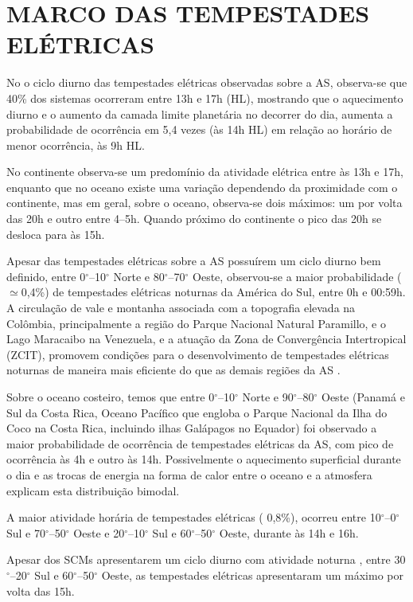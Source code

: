 \section{MARCO DAS TEMPESTADES ELÉTRICAS}

No o ciclo diurno das tempestades elétricas observadas sobre a AS, observa-se que 40\% dos sistemas ocorreram entre 13h e 17h (HL), mostrando que o aquecimento diurno e o aumento da camada limite planetária no decorrer do dia, aumenta a probabilidade de ocorrência em 5,4 vezes (às 14h HL) em relação ao horário de menor ocorrência, às 9h HL.

No continente observa-se um predomínio da atividade elétrica entre às 13h e 17h, enquanto que no oceano existe uma variação dependendo da proximidade com o continente, mas em geral, sobre o oceano, observa-se dois máximos: um por volta das 20h e outro entre 4--5h. Quando  próximo do continente o pico das 20h se desloca para às 15h.  

Apesar das tempestades elétricas sobre a AS possuírem um ciclo diurno bem definido, entre 0$^{\circ}$--10$^{\circ}$ Norte e 80$^{\circ}$--70$^{\circ}$ Oeste, observou-se a maior probabilidade ($\simeq$0,4\%) de tempestades elétricas noturnas da América do Sul, entre 0h e 00:59h. A circulação de vale e montanha associada com a topografia elevada na Colômbia, principalmente a região do Parque Nacional Natural Paramillo, e o Lago Maracaibo na Venezuela, e a atuação da Zona de Convergência Intertropical (ZCIT), promovem condições para o desenvolvimento de tempestades elétricas noturnas de maneira mais eficiente do que as demais regiões da AS \cite{burgesser2012}.

Sobre o oceano costeiro, temos que entre 0$^{\circ}$--10$^{\circ}$ Norte e 90$^{\circ}$--80$^{\circ}$ Oeste (Panamá e Sul da Costa Rica,  Oceano Pacífico que engloba o Parque Nacional da Ilha do Coco na Costa Rica, incluindo ilhas Galápagos no Equador) foi observado a maior probabilidade de ocorrência de tempestades elétricas da AS, com pico de ocorrência às 4h e outro às 14h. Possivelmente o aquecimento superficial durante o dia e as trocas de energia na forma de calor entre o oceano e a atmosfera explicam esta distribuição bimodal.

A maior atividade horária de tempestades elétricas ( 0,8\%), ocorreu entre 10$^{\circ}$--0$^{\circ}$ Sul e 70$^{\circ}$--50$^{\circ}$ Oeste e 20$^{\circ}$--10$^{\circ}$ Sul e 60$^{\circ}$--50$^{\circ}$ Oeste, durante às 14h e 16h.

Apesar dos SCMs apresentarem um ciclo diurno com atividade noturna \cite{Velasco1987, Durkee2009, machado1998}, entre 30$^{\circ}$--20$^{\circ}$ Sul e 60$^{\circ}$--50$^{\circ}$ Oeste, as tempestades elétricas apresentaram um máximo por volta das 15h.


